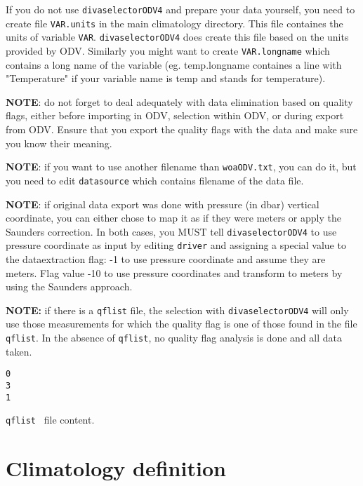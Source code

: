 \documentclass[8pt,a4paper,notitlepage]{book}
\begin{document}
If you do not use {\tt divaselectorODV4} and prepare your data yourself, you need to create  file {\tt VAR.units} in the main climatology directory. This file containes the units of variable {\tt VAR}. {\tt divaselectorODV4} does create this file based on the units provided by ODV. Similarly you might want to create {\tt VAR.longname} which contains a long name of the variable (eg. temp.longname containes a line with "Temperature" if your variable name is temp and stands for temperature).

{\bf NOTE}: do not forget to deal adequately with data elimination based on quality flags, either before importing in ODV, selection within ODV, or during export from ODV. Ensure that you export the quality flags with the data and make sure you know their meaning.

{\bf NOTE}: if you want to use another filename than {\tt woaODV.txt}, you can do it, but you need to edit {\tt datasource} which contains filename of the data file.

{\bf NOTE}: if original data export was done with pressure (in dbar) vertical coordinate, you can either chose to map it as if they were meters or apply the Saunders correction. In both cases, you MUST tell {\tt divaselectorODV4} to use pressure coordinate as input by editing {\tt driver} and assigning a special value to the dataextraction flag: -1 to use pressure coordinate and assume they are meters. Flag value -10 to use pressure coordinates and transform to meters by using the Saunders approach.


{\bf NOTE:} if there is a {\tt qflist} file, the selection with {\tt divaselectorODV4} will only use those measurements for which the quality flag is one of those found in the file {\tt qflist}. In the absence of {\tt qflist}, no quality flag analysis is done and all data taken.
 
\begin{exfile}[H]
\begin{footnotesize}
\begin{verbatim}
0
3
1
\end{verbatim}
\end{footnotesize}
\caption{{\tt qflist } file content.} 
\end{exfile}



\section{Climatology definition}
\end{document}
